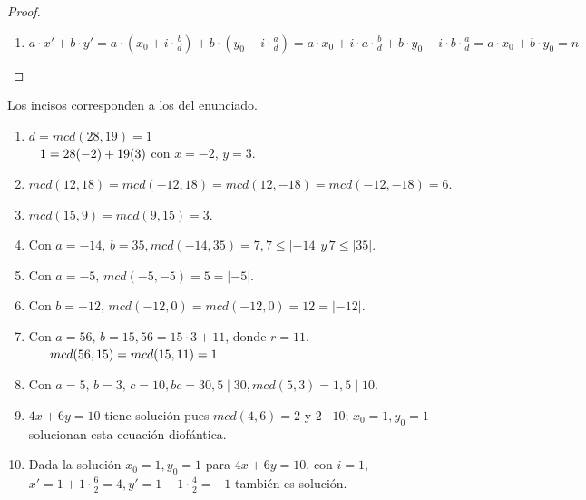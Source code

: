 \begin{proof}
\begin{enumerate}[label=\roman*)]
\begin{enumerate}
Por hipótesis existen $x_{0}, y_{0} \in \Z$ tales que $a \cdot x_{0}+b \cdot y_{0}=n$,\\
Por lo tanto: $d \mid n$.
\item Si $mcd(a, b) \mid n$ entonces\\
la ecuación diofántica $a \cdot x+b \cdot y=n$ tiene soluciones enteras:\\
Como $d=mcd(a,b)$, (por el inciso i): $\exists x_{0}, y_{0} \in \Z$ tales que $d=a \cdot x_{0}+b \cdot y_{0}$\\
Por hipótesis: $d \mid n$. Es decir: $\frac{n}{d} \in \Z$\\
Por lo tanto: $\frac{n}{d} \cdot x_{0} \in \Z, \frac{n}{d} \cdot y_{0} \in \Z$\\
Además ambos enteros solucionan la ecuación diofántica pues:\\
$a \cdot \frac{n}{d} \cdot x_{0}+b \cdot \frac{n}{d} \cdot y_{0}=\frac{n}{d} \cdot (a \cdot x_{0}+b \cdot y_{0})=\frac{n}{d} \cdot d=n$
\end{enumerate}
\setcounter{enumi}{9}
\item $a \cdot x'+b \cdot y'=a \cdot (x_{0}+i \cdot \frac{b}{d})+b \cdot(y_{0}-i \cdot \frac{a}{d})=a \cdot x_{0}+i \cdot a \cdot \frac{b}{d}+b \cdot y_{0}-i \cdot b \cdot \frac{a}{d}=a \cdot x_{0}+b \cdot y_{0}=n$
\end{enumerate}
\end{proof}

\begin{ejemplo} Los incisos corresponden a los del enunciado.
\begin{enumerate}[label=\roman*)]
\item $d = mcd(28,19) = 1$ \\
$\hspace*{0.8em}1 = 28(-2) + 19(3)$   con $x = -2, \, y = 3$. 
\item $mcd(12,18) = mcd(-12,18) = mcd(12,-18) = mcd(-12,-18) = 6$. 
\item $mcd(15,9) = mcd(9,15) = 3$. 
\item Con $a = -14, \, b = 35, mcd(-14,35) = 7, 7 \leq |-14| \, y \, 7 \leq |35|$. 
\item Con $a = -5, \, mcd(-5,-5) = 5 = |-5|$. 
\item Con $b = -12, \, mcd(-12,0) = mcd(-12,0) = 12 = |-12|$. 
\item Con $a = 56, \, b = 15, 56 = 15 \cdot 3 + 11$, donde $r = 11$. \\
$\hspace*{1.6em}mcd(56,15) = mcd(15,11) = 1$
\item Con $a = 5, \, b = 3, \, c = 10, bc = 30, 5 \mid 30, mcd(5,3) = 1, 5 \mid 10$.
\item  $4x + 6y = 10$ tiene solución pues $mcd(4,6) = 2$ y $2 \mid 10$; $x_0=1, y_0=1$ solucionan esta ecuación diofántica.
\item Dada la solución $x_0=1, y_0=1$ para $4x + 6y = 10$, con $i=1$, $x'=1+1 \cdot \frac{6}{2}=4, y'=1-1 \cdot \frac{4}{2}=-1$ también es solución.
\end{enumerate}
\end{ejemplo}

